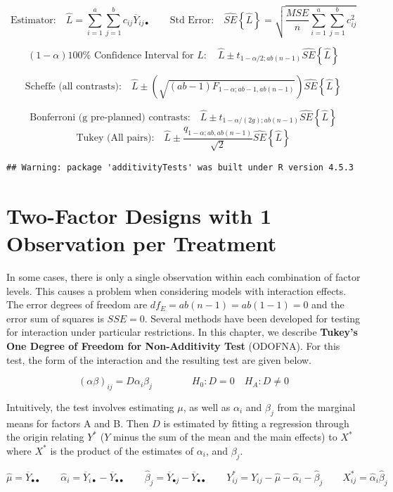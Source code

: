 \documentclass[
]{book}
\begin{document}
\[
\mbox{Estimator:} \quad
\hat{L}=\sum_{i=1}^a\sum_{j=1}^b c_{ij}\overline{Y}_{ij\bullet} \qquad
\mbox{Std Error:} \quad
\hat{SE}\left\{\hat{L}\right\}=
\sqrt{\frac{MSE}{n}\sum_{i=1}^a\sum_{j=1}^b c_{ij}^2}
\]

\[
(1-\alpha)100\% \mbox{ Confidence Interval for }L: \quad
\hat{L} \pm t_{1-\alpha/2; ab(n-1)} \hat{SE}\left\{\hat{L}\right\}
\]

\[
\mbox{Scheffe (all contrasts):}\quad
\hat{L} \pm \left(\sqrt{(ab-1)F_{1-\alpha;ab-1,ab(n-1)}}\right)
\hat{SE}\left\{\hat{L}\right\}
\]

\[
\mbox{Bonferroni (g pre-planned) contrasts:} \quad
\hat{L} \pm t_{1-\alpha/(2g); ab(n-1)} \hat{SE}\left\{\hat{L}\right\}
\] \[
\mbox{Tukey (All pairs):} \quad
\hat{L} \pm \frac{q_{1-\alpha; ab, ab(n-1)}}{\sqrt{2}} \hat{SE}\left\{\hat{L}\right\}
\]

\begin{verbatim}
## Warning: package 'additivityTests' was built under R version 4.5.3
\end{verbatim}

\chapter{Two-Factor Designs with 1 Observation per
Treatment}\label{two-factor-designs-with-1-observation-per-treatment}

In some cases, there is only a single observation within each
combination of factor levels. This causes a problem when considering
models with interaction effects. The error degrees of freedom are
\(df_E=ab(n-1)=ab(1-1)=0\) and the error sum of squares is \(SSE=0\).
Several methods have been developed for testing for interaction under
particular restrictions. In this chapter, we describe \textbf{Tukey's
One Degree of Freedom for Non-Additivity Test} (ODOFNA). For this test,
the form of the interaction and the resulting test are given below.

\[
\left(\alpha\beta\right)_{ij} = D\alpha_i\beta_j \qquad \qquad H_0:D=0 \quad H_A:D\ne 0
\]

Intuitively, the test involves estimating \(\mu\), as well as
\(\alpha_i\) and \(\beta_j\) from the marginal means for factors A and
B. Then \(D\) is estimated by fitting a regression through the origin
relating \(Y^*\) (\(Y\) minus the sum of the mean and the main effects)
to \(X^*\) where \(X^*\) is the product of the estimates of
\(\alpha_i\), and \(\beta_j\).

\[
\hat{\mu}=\overline{Y}_{\bullet\bullet}\qquad
\hat{\alpha}_i = \overline{Y}_{i\bullet} - \overline{Y}_{\bullet\bullet}\qquad
\hat{\beta}_j = \overline{Y}_{\bullet j} - \overline{Y}_{\bullet\bullet} \qquad
Y_{ij}^*=Y_{ij}-\hat{\mu}-\hat{\alpha}_i-\hat{\beta}_j \qquad
 X_{ij}^*=\hat{\alpha}_i\hat{\beta}_j
\]
\end{document}

